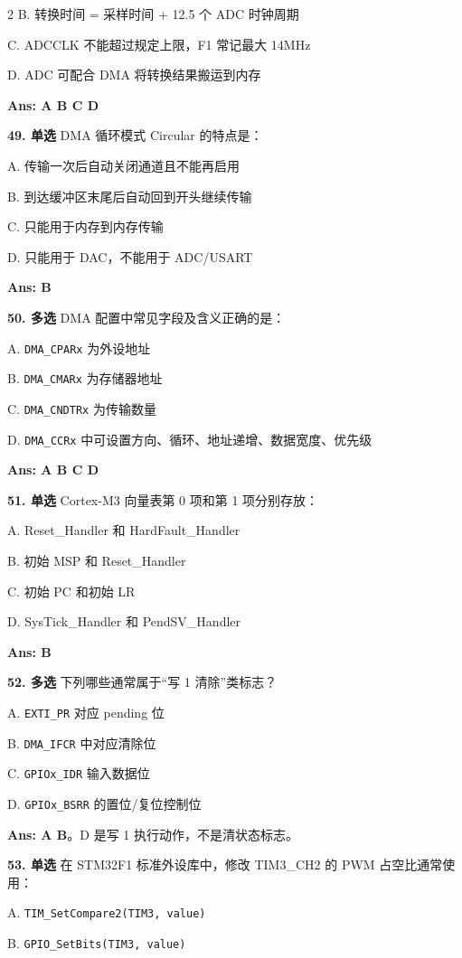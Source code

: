 \documentclass[UTF8,zihao=-5]{ctexart}
\begin{document}
\begin{multicols*}{2}
B. 转换时间 = 采样时间 + 12.5 个 ADC 时钟周期\par
C. ADCCLK 不能超过规定上限，F1 常记最大 14MHz\par
D. ADC 可配合 DMA 将转换结果搬运到内存\par
\textbf{Ans: A B C D}\par
\textbf{49. 单选} DMA 循环模式 Circular 的特点是：\par
A. 传输一次后自动关闭通道且不能再启用\par
B. 到达缓冲区末尾后自动回到开头继续传输\par
C. 只能用于内存到内存传输\par
D. 只能用于 DAC，不能用于 ADC/USART\par
\textbf{Ans: B}\par
\textbf{50. 多选} DMA 配置中常见字段及含义正确的是：\par
A. \texttt{DMA\_CPARx} 为外设地址\par
B. \texttt{DMA\_CMARx} 为存储器地址\par
C. \texttt{DMA\_CNDTRx} 为传输数量\par
D. \texttt{DMA\_CCRx} 中可设置方向、循环、地址递增、数据宽度、优先级\par
\textbf{Ans: A B C D}\par
\textbf{51. 单选} Cortex-M3 向量表第 0 项和第 1 项分别存放：\par
A. Reset\_Handler 和 HardFault\_Handler\par
B. 初始 MSP 和 Reset\_Handler\par
C. 初始 PC 和初始 LR\par
D. SysTick\_Handler 和 PendSV\_Handler\par
\textbf{Ans: B}\par
\textbf{52. 多选} 下列哪些通常属于“写 1 清除”类标志？\par
A. \texttt{EXTI\_PR} 对应 pending 位\par
B. \texttt{DMA\_IFCR} 中对应清除位\par
C. \texttt{GPIOx\_IDR} 输入数据位\par
D. \texttt{GPIOx\_BSRR} 的置位/复位控制位\par
\textbf{Ans: A B}。D 是写 1 执行动作，不是清状态标志。\par
\textbf{53. 单选} 在 STM32F1 标准外设库中，修改 TIM3\_CH2 的 PWM 占空比通常使用：\par
A. \texttt{TIM\_SetCompare2(TIM3, value)}\par
B. \texttt{GPIO\_SetBits(TIM3, value)}\par

\end{multicols*}
\end{document}
